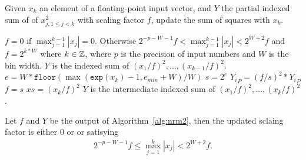     \begin{alg}
        Given $x_k$ an element of a floating-point input vector,
        and $Y$ the partial indexed sum of of $x^2_{j, 1 \leq j < k}$
        with scaling factor $f$,
        update the sum of squares with $x_k$.
        \begin{algorithmic}[1]
            \Require $f=0$ if $\max_{j=1}^{k-1}|x_j| = 0$.
            Otherwise $2^{-p-W-1} f < \max_{j=1}^{k-1}|x_j| < 2^{W+2} f$
            and $f = 2^{k*W}$ where $k \in \mathbb{Z}$,
            where $p$ is the precision of input numbers and $W$ is the bin width.
            $Y$ is the indexed sum of $(x_1/f)^2, \ldots, (x_{k-1}/f)^2$.
            \State $e = W * \texttt{floor}(\max(\texttt{exp}(x_k) - 1,e_{min}+W) / W)$
                \label{alg:nrm2.line.e}
            \State $s = 2^e$
                    \State ${Y_i}_P = (f/s)^2 * {Y_i}_P$
                \EndFor
                \State $f = s$
          \EndIf
          \State $xs = (x_k / f)^2$
          \State {}
          \Ensure
            $Y$ is the intermediate indexed sum of $(x_1/f)^2, \ldots, (x_{k}/f)^2$.
        \end{algorithmic}
        \label{alg:nrm2}
    \end{alg}

    \begin{lem}
    \label{lem:nrm2_scaling}
    Let $f$ and $Y$ be the output of Algorithm~\ref{alg:nrm2}, then the updated sclaing factor is either $0$  or
    or satisying
    \begin{equation}
    \begin{aligned}
        2^{-p-W-1}f \leq \max_{j=1}^k |x_j| < 2^{W+2} f.
    \end{aligned}
    \end{equation}
    \end{lem}

